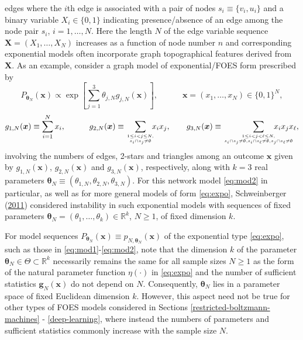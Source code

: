 \documentclass[]{article}
\theoremstyle{definition}
\begin{document}
edges where the \(i\)th edge is associated with a pair of nodes
\(s_i \equiv \{v_i,u_i\}\) and a binary variable \(X_i\in\{0,1\}\)
indicating presence/absence of an edge among the node pair \(s_i\),
\(i=1,\ldots,N\). Here the length \(N\) of the edge variable sequence
\(\boldsymbol X = (X_1,\ldots,X_N)\) increases as a function of node
number \(n\) and corresponding exponential models often incorporate
graph topographical features derived from \(\boldsymbol X\). As an
example, consider a graph model of exponential/FOES form prescribed by
\begin{equation}
\label{eq:mod2}
P_{\boldsymbol \theta_N}(\boldsymbol x) \propto
 \exp\left[\sum_{j=1}^3 \theta_{j,N} g_{j,N}(\boldsymbol x)\right], \quad\qquad \boldsymbol x=(x_1,\ldots,x_N)  \in\{0,1\}^N,
\end{equation}
\[
  g_{1,N}(\boldsymbol x) \equiv \sum_{i=1}^N  x_i, \qquad\quad g_{2,N}(\boldsymbol x) \equiv \sum_{1 \leq i<j \leq N,\atop s_i \cap s_j \neq \emptyset}\!\!\!   x_i x_j, \qquad
  g_{3,N}(\boldsymbol x) \equiv \sum_{1 \leq i<j<\ell \leq N, \atop s_i \cap s_j \neq \emptyset,s_i \cap s_\ell \neq \emptyset, \\ s_j \cap s_\ell \neq \emptyset } \!\!\!\!\!\!\!\!  \!\!\!\!\!\!\!\!   x_i x_j x_\ell,
\] involving the numbers of edges, 2-stars and triangles among an
outcome \(\boldsymbol x\) given by \(g_{1,N}(\boldsymbol x)\),
\(g_{2,N}(\boldsymbol x)\) and \(g_{3,N}(\boldsymbol x)\), respectively,
along with \(k=3\) real parameters
\(\boldsymbol \theta_N \equiv (\theta_{1,N},\theta_{2,N},\theta_{3,N})\).
For this network model \eqref{eq:mod2} in particular, as well as for more
general models of form \eqref{eq:expo}, Schweinberger
(\protect\hyperlink{ref-schweinberger2011instability}{2011}) considered
instability in such exponential models with sequences of fixed
parameters
\(\boldsymbol \theta_N = (\theta_1,\ldots,\theta_k)\in\mathbb{R}^k\),
\(N \geq 1\), of fixed dimension \(k\).

For model sequences
\(P_{\boldsymbol \theta_N}(\boldsymbol x)\equiv p_{N,\boldsymbol \theta_N}(\boldsymbol x)\)
of the exponential type \eqref{eq:expo}, such as those in
\eqref{eq:mod1}-\eqref{eq:mod2}, note that the dimension \(k\) of the
parameter \(\boldsymbol \theta_N\in\Theta \subset \mathbb{R}^k\)
necessarily remains the same for all sample sizes \(N \geq 1\) as the
form of the natural parameter function \(\eta(\cdot)\) in \eqref{eq:expo}
and the number of sufficient statistics
\(\boldsymbol g_{N}(\boldsymbol x)\) do not depend on \(N\).
Consequently, \(\boldsymbol \theta_N\) lies in a parameter space of
fixed Euclidean dimension \(k\). However, this aspect need not be true
for other types of FOES models considered in Sections
\ref{restricted-boltzmann-machines} - \ref{deep-learning}, where instead
the numbers of parameters and sufficient statistics commonly increase
with the sample size \(N\).
\end{document}
